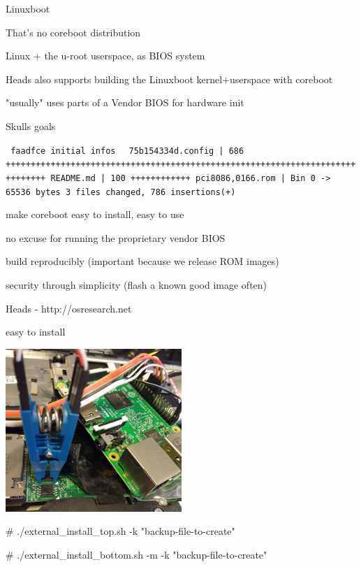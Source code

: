\documentclass[14pt]{beamer}
\begin{document}
\begin{frame}
Linuxboot
\end{frame}


\begin{frame}
That's no coreboot distribution
\pause

Linux + the u-root userspace, as BIOS system

Heads also supports building the Linuxboot kernel+userspace with coreboot

"usually" uses parts of a Vendor BIOS for hardware init
\end{frame}


\begin{frame}
Skulls goals
\end{frame}


\begin{frame}
\texttt{
faadfce initial infos
}
\texttt{
 75b154334d.config | 686 ++++++++++++++++++++++++++++++++++++++++++++++++++++++++++++++++++++++++++++++
 README.md         | 100 ++++++++++++
 pci8086,0166.rom  | Bin 0 -> 65536 bytes
 3 files changed, 786 insertions(+)
}
\end{frame}


\begin{frame}
make coreboot easy to install, easy to use

no excuse for running the proprietary vendor BIOS
\pause

build reproducibly (important because we release ROM images)

security through simplicity (flash a known good image often)

Heads - http://osresearch.net
\end{frame}


\begin{frame}
easy to install
\end{frame}


\begin{frame}
\includegraphics[width=0.5\textwidth]{rpi_clip.jpg}

\# ./external\_install\_top.sh -k "backup-file-to-create"

\# ./external\_install\_bottom.sh -m -k "backup-file-to-create"
\end{frame}
\end{document}
